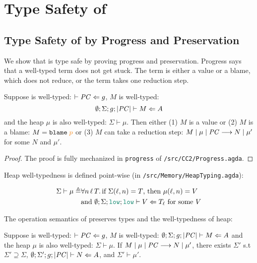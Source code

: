 \chapter{Type Safety of \Surface}
\label{ch:type-safety}

\section{Type Safety of \CC by Progress and Preservation}
\label{sec:cc-type-safety}

We show that \CC is type safe by proving progress and preservation. Progress
says that a well-typed \CC term does not get stuck. The term is either a value
or a blame, which does not reduce, or the term takes one reduction step.

\begin{theorem}[Progress]
\label{thm:progress}
Suppose \PC is well-typed: $\vdash \mathit{PC} \Leftarrow g$,
$M$ is well-typed:
\[
\emptyset ; \Sigma ; g ; | \mathit{PC} | \vdash M \Leftarrow A
\]
and the heap $\mu$ is also well-typed: $\Sigma \vdash \mu$.
Then either (1) $M$ is a value or (2) $M$ is a blame: {\normalfont $M = \blame{p}$}
or (3) $M$ can take a reduction step:
${M}\mid{\mu}\mid{\ensuremath{\mathit{PC}}}\longrightarrow{N}\mid{\mu'}$ for some $N$ and $\mu'$.
\end{theorem}
\begin{proof}
  The proof is fully mechanized in \texttt{progress} of \texttt{/src/CC2/Progress.agda}.
\end{proof}

Heap well-typedness is defined point-wise (in \texttt{/src/Memory/HeapTyping.agda}):

\begin{align*}
\Sigma \vdash \mu \triangleq & \forall n\,\ell\,T.\,\text{if}~\Sigma(\ell,n)=T \text{, then}~\mu(\ell,n)=V \\
& \text{and}~\emptyset;\Sigma;\low;\low\vdash V \Leftarrow T_{\ell} ~\text{for some}~ V
\end{align*}

The operation semantics of \CC preserves types and the well-typedness of heap:

\begin{theorem}[Preservation]
\label{thm:preservation}
Suppose \PC is well-typed:  $\vdash \mathit{PC} \Leftarrow g$,
$M$ is well-typed: $\emptyset ; \Sigma ; g ; |\mathit{PC}| \vdash M \Leftarrow A$
and the heap $\mu$ is also well-typed: $\Sigma \vdash \mu$.
If ${M}\mid{\mu}\mid{\ensuremath{\mathit{PC}}}\longrightarrow{N}\mid{\mu'}$, there exists $\Sigma'$ s.t
$\Sigma' \supseteq \Sigma$, $\emptyset ; \Sigma' ; g ; |\mathit{PC}| \vdash N \Leftarrow A$,
and $\Sigma' \vdash \mu'$.
\end{theorem}

